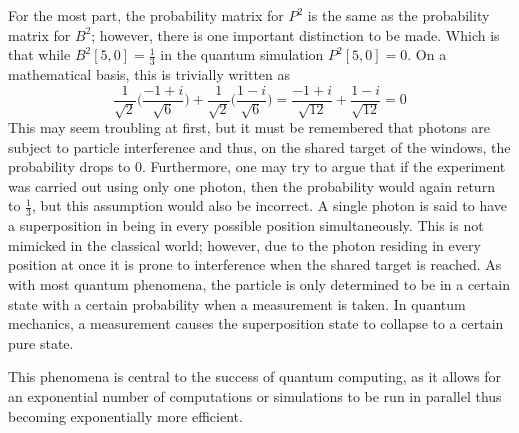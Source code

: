 \documentclass[12pt]{article}
\begin{document}
\par
For the most part, the probability matrix for $P^2$ is the same as the probability matrix for $B^2$; however, there is one important distinction to be made. Which is that while $B^2[5,0] = \frac{1}{3}$ in the quantum simulation $P^2[5,0] = 0$. On a mathematical basis, this is trivially written as 
$$\frac{1}{\sqrt{2}}\bigg(\frac{-1+i}{\sqrt{6}}\bigg) + \frac{1}{\sqrt{2}}\bigg(\frac{1-i}{\sqrt{6}}\bigg) = \frac{-1+i}{\sqrt{12}} + \frac{1-i}{\sqrt{12}} = 0$$
This may seem troubling at first, but it must be remembered that photons are subject to particle interference and thus, on the shared target of the windows, the probability drops to 0. Furthermore, one may try to argue that if the experiment was carried out using only one photon, then the probability would again return to $\frac{1}{3}$, but this assumption would also be incorrect. A single photon is said to have a superposition in being in every possible position simultaneously. This is not mimicked in the classical world; however, due to the photon residing in every position at once it is prone to interference when the shared target is reached. As with most quantum phenomena, the particle is only determined to be in a certain state with a certain probability when a measurement is taken. In quantum mechanics, a measurement causes the superposition state to collapse to a certain pure state.\cite{intro}\par
This phenomena is central to the success of quantum computing, as it allows for an exponential number of computations or simulations to be run in parallel thus becoming exponentially more efficient.
\end{document}
